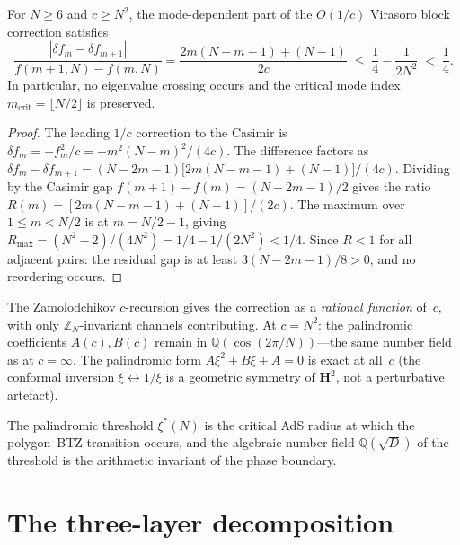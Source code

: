 \begin{proposition}
\label{prop:non-crossing}
For $N \ge 6$ and $c \ge N^2$, the mode-dependent part of the
$O(1/c)$ Virasoro block correction satisfies
\begin{equation}\label{eq:non-crossing}
  \frac{|\delta f_m - \delta f_{m+1}|}{f(m{+}1,N) - f(m,N)}
  = \frac{2m(N{-}m{-}1) + (N{-}1)}{2c}
  \;\le\; \frac{1}{4} - \frac{1}{2N^2}
  \;<\; \frac{1}{4}.
\end{equation}
In particular, no eigenvalue crossing occurs and the critical mode
index $m_{\mathrm{crit}} = \lfloor N/2\rfloor$ is preserved.
\end{proposition}

\begin{proof}
The leading $1/c$ correction to the Casimir is
$\delta f_m = -f_m^2/c = -m^2(N{-}m)^2/(4c)$.
The difference factors as
$\delta f_m - \delta f_{m+1}
= (N{-}2m{-}1)\bigl[2m(N{-}m{-}1)+(N{-}1)\bigr]/(4c)$.
Dividing by the Casimir gap $f(m{+}1)-f(m) = (N{-}2m{-}1)/2$
gives the ratio $R(m) = [2m(N{-}m{-}1)+(N{-}1)]/(2c)$.
The maximum over $1 \le m < N/2$ is at $m = N/2 - 1$, giving
$R_{\max} = (N^2{-}2)/(4N^2) = 1/4 - 1/(2N^2) < 1/4$.
Since $R < 1$ for all adjacent pairs: the residual gap is at least
$3(N{-}2m{-}1)/8 > 0$, and no reordering occurs.
\end{proof}

\begin{remark}
\label{rmk:field-preservation}
The Zamolodchikov $c$-recursion gives the correction as a
\emph{rational function} of~$c$, with only
$\mathbb{Z}_N$-invariant channels contributing.
At $c = N^2$: the palindromic coefficients $A(c), B(c)$ remain in
$\mathbb{Q}(\cos(2\pi/N))$---the same number field as at $c = \infty$.
The palindromic form $A\xi^2 + B\xi + A = 0$ is exact at all~$c$
(the conformal inversion $\xi \leftrightarrow 1/\xi$ is a geometric
symmetry of $\mathbf{H}^2$, not a perturbative artefact).
\end{remark}

The palindromic threshold $\xi^*(N)$ is the critical AdS
radius at which the polygon--BTZ transition occurs, and
the algebraic number field $\mathbb{Q}(\sqrt{D})$ of the
threshold is the arithmetic invariant of the phase boundary.


\section{The three-layer decomposition}
\label{sec:three-layer}

